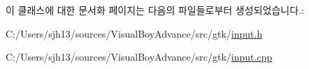 이 클래스에 대한 문서화 페이지는 다음의 파일들로부터 생성되었습니다.\+:\begin{DoxyCompactItemize}
\item 
C\+:/\+Users/sjh13/sources/\+Visual\+Boy\+Advance/src/gtk/\mbox{\hyperlink{gtk_2input_8h}{input.\+h}}\item 
C\+:/\+Users/sjh13/sources/\+Visual\+Boy\+Advance/src/gtk/\mbox{\hyperlink{input_8cpp}{input.\+cpp}}\end{DoxyCompactItemize}
